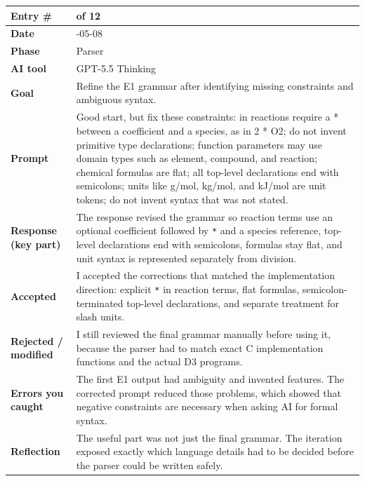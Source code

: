 \documentclass[11pt,a4paper]{article}
\newcommand{\code}[1]{\texttt{#1}}
\newcommand{\entrygap}{\vspace{8pt}}
\newenvironment{journalentry}{%
  \begin{center}\small\renewcommand{\arraystretch}{1.22}%
  \begin{tabular}{|>{\columncolor{anscodebg}\bfseries}p{3.0cm}|>{\RaggedRight\arraybackslash}p{12.25cm}|}%
  \hline
}{%
  \end{tabular}\end{center}\entrygap
}
\begin{document}
\begin{journalentry}
Entry \# & 12 of 12 \\ \hline
Date & 2026-05-08 \\ \hline
Phase & Parser \\ \hline
AI tool & GPT-5.5 Thinking \\ \hline
Goal & Refine the E1 grammar after identifying missing constraints and ambiguous syntax. \\ \hline
Prompt & Good start, but fix these constraints: in reactions require a * between a coefficient and a species, as in 2 * O2; do not invent primitive type declarations; function parameters may use domain types such as element, compound, and reaction; chemical formulas are flat; all top-level declarations end with semicolons; units like g/mol, kg/mol, and kJ/mol are unit tokens; do not invent syntax that was not stated. \\ \hline
Response (key part) & The response revised the grammar so reaction terms use an optional coefficient followed by \code{*} and a species reference, top-level declarations end with semicolons, formulas stay flat, and unit syntax is represented separately from division. \\ \hline
Accepted & I accepted the corrections that matched the implementation direction: explicit \code{*} in reaction terms, flat formulas, semicolon-terminated top-level declarations, and separate treatment for slash units. \\ \hline
Rejected / modified & I still reviewed the final grammar manually before using it, because the parser had to match exact C implementation functions and the actual D3 programs. \\ \hline
Errors you caught & The first E1 output had ambiguity and invented features. The corrected prompt reduced those problems, which showed that negative constraints are necessary when asking AI for formal syntax. \\ \hline
Reflection & The useful part was not just the final grammar. The iteration exposed exactly which language details had to be decided before the parser could be written safely. \\ \hline
\end{journalentry}
\end{document}
